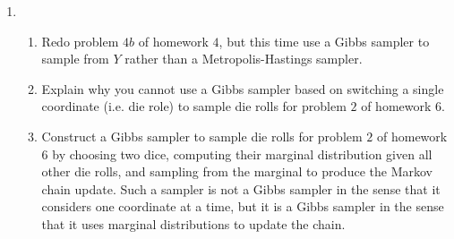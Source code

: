 \documentclass{article}
\begin{document}
\begin{enumerate}
\item 
\begin{enumerate}
\item Redo problem $4b$ of homework $4$, but this time use a Gibbs sampler to sample from $Y$ rather than a Metropolis-Hastings sampler.
\item Explain why you cannot use a Gibbs sampler based on switching a single coordinate (i.e. die role) to sample die rolls for problem $2$ of homework $6$.
\item Construct a Gibbs sampler to sample die rolls for problem $2$ of homework $6$ by choosing two dice, computing their marginal distribution given all other die rolls, and sampling from the marginal  to produce the Markov chain update.  Such a sampler is not a Gibbs sampler in the sense that it considers one coordinate at a time, but it is a Gibbs sampler in the sense that it uses marginal distributions to update the chain.
\end{enumerate}

\end{enumerate}
\end{document}
